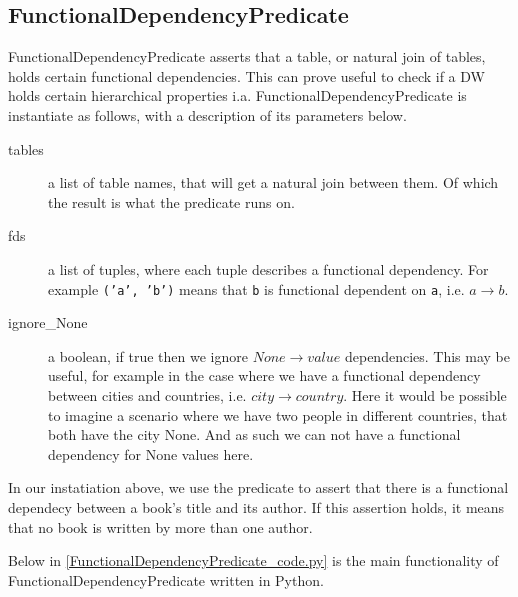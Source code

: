 \subsection{FunctionalDependencyPredicate}
FunctionalDependencyPredicate asserts that a table, or natural join of tables, holds certain functional dependencies. This can prove useful to check if a DW holds certain hierarchical properties i.a. FunctionalDependencyPredicate is instantiate as follows, with a description of its parameters below.


\begin{description}
\item [tables] a list of table names, that will get a natural join between them. Of which the result is what the predicate runs on. 
\item [fds] a list of tuples, where each tuple describes a functional dependency. For example \texttt{('a', 'b')} means that \texttt{b} is functional dependent on \texttt{a}, i.e. $a \rightarrow b$.
\item [ignore\_None] a boolean, if true then we ignore $None \rightarrow value$ dependencies. This may be useful, for example in the case where we have a functional dependency between cities and countries, i.e. $city \rightarrow country$. Here it would be possible to imagine a scenario where we have two people in different countries, that both have the city None. And as such we can not have a functional dependency for None values here.
\end{description}


In our instatiation above, we use the predicate to assert that there is a functional dependecy between a book's title and its author. If this assertion holds, it means that no book is written by more than one author. 

Below in \cref{FunctionalDependencyPredicate_code.py} is the main functionality of FunctionalDependencyPredicate written in Python.


